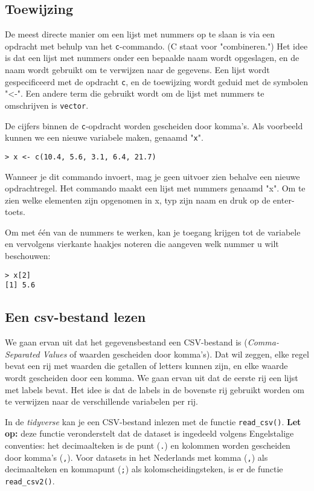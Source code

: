 \subsection{Toewijzing}

De meest directe manier om een lijst met nummers op te slaan is via een opdracht met behulp van het \texttt{c}-commando. (C staat voor "combineren.") Het idee is dat een lijst met nummers onder een bepaalde naam wordt opgeslagen, en de naam wordt gebruikt om te verwijzen naar de gegevens. Een lijst wordt gespecificeerd met de opdracht \texttt{c}, en de toewijzing wordt geduid met de symbolen "<-". Een andere term die gebruikt wordt om de lijst met nummers te omschrijven is \texttt{vector}.

De cijfers binnen de \texttt{c}-opdracht worden gescheiden door komma's. Als voorbeeld kunnen we een nieuwe variabele maken, genaamd "\texttt{x}".

\begin{lstlisting}
> x <- c(10.4, 5.6, 3.1, 6.4, 21.7)
\end{lstlisting}

Wanneer je dit commando invoert, mag je geen uitvoer zien behalve een nieuwe opdrachtregel. Het commando maakt een lijst met nummers genaamd "x". Om te zien welke elementen zijn opgenomen in x, typ zijn naam en druk op de enter-toets.

Om met \'e\'en van de nummers te werken, kan je toegang krijgen tot de variabele en vervolgens vierkante haakjes noteren die aangeven welk nummer u wilt beschouwen:

\begin{lstlisting}
> x[2]
[1] 5.6
\end{lstlisting}

\subsection{Een csv-bestand lezen}

We gaan ervan uit dat het gegevensbestand een CSV-bestand is (\textit{Comma-Separated Values} of waarden gescheiden door komma's). Dat wil zeggen, elke regel bevat een rij met waarden die getallen of letters kunnen zijn, en elke waarde wordt gescheiden door een komma. We gaan ervan uit dat de eerste rij een lijst met labels bevat. Het idee is dat de labels in de bovenste rij gebruikt worden om te verwijzen naar de verschillende variabelen per rij.

In de \textit{tidyverse} kan je een CSV-bestand inlezen met de functie \texttt{read\_csv()}. \textbf{Let op:} deze functie veronderstelt dat de dataset is ingedeeld volgens Engelstalige conventies: het decimaalteken is de punt (\texttt{.}) en kolommen worden gescheiden door komma's (\texttt{,}). Voor datasets in het Nederlands met komma (\texttt{,}) als decimaalteken en kommapunt (\texttt{;}) als kolomscheidingsteken, is er de functie \texttt{read\_csv2()}.

